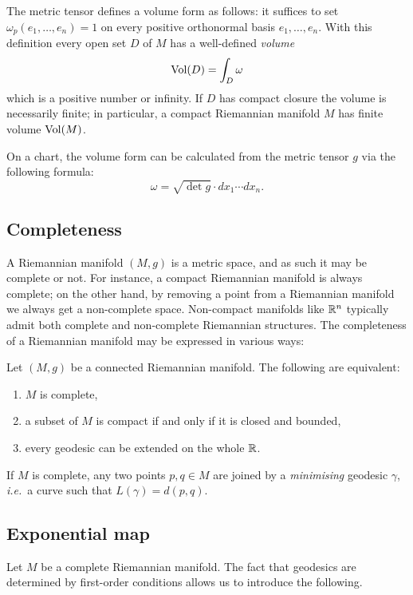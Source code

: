 The metric tensor defines a volume form as follows: it suffices to set $\omega_p(e_1,\ldots, e_n)=1$ on every positive orthonormal basis $e_1,\ldots, e_n$. With this definition every open set $D$ of $M$ has a well-defined \emph{volume} 
$${\rm Vol}(D) = \int_D \omega$$
which is a positive number or infinity. If $D$ has compact closure the volume is necessarily finite; in particular, a compact Riemannian manifold $M$ has finite volume ${\rm Vol} (M)$.

On a chart, the volume form can be calculated from the metric tensor $g$ via the following formula: 
$$\omega = \sqrt{\det g} \cdot dx_1\cdots dx_n.$$

\subsection{Completeness}
A Riemannian manifold $(M,g)$ is a metric space, and as such it may be complete or not. For instance,
a compact Riemannian manifold is always complete; on the other hand, by removing a point from a Riemannian manifold we always get a non-complete space. Non-compact manifolds like $\mathbb{R}^n$ typically admit both complete and non-complete Riemannian structures. 
The completeness of a Riemannian manifold may be expressed in various ways:

\begin{teo} \label{HR:teo}
Let $(M,g)$ be a connected Riemannian manifold. The following are equivalent: 
\begin{enumerate}
\item $M$ is complete,
\item a subset of $M$ is compact if and only if it is closed and bounded,
\item every geodesic can be extended on the whole $\mathbb{R}$.
\end{enumerate}
If $M$ is complete, any two points $p,q \in M$ are joined by a \emph{minimising} geodesic $\gamma$, \emph{i.e.}~a curve such that $L(\gamma) = d(p,q)$.
\end{teo}


\subsection{Exponential map} \label{esponenziale:subsection}
Let $M$ be a complete Riemannian manifold. The fact that geodesics are determined by first-order conditions allows us to introduce the following.

